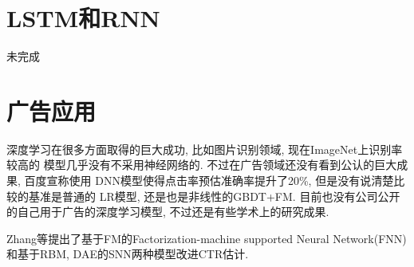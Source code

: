 \documentclass{ctexart}
\begin{document}
\section{LSTM和RNN}
未完成

\section{广告应用}
深度学习在很多方面取得的巨大成功, 比如图片识别领域, 现在ImageNet上识别率较高的
模型几乎没有不采用神经网络的. 不过在广告领域还没有看到公认的巨大成果, 百度宣称使用
DNN模型使得点击率预估准确率提升了20\%, 但是没有说清楚比较的基准是普通的
LR模型, 还是也是非线性的GBDT+FM.
目前也没有公司公开的自己用于广告的深度学习模型, 不过还是有些学术上的研究成果.

Zhang等\cite{zhang2016deep}提出了基于FM的Factorization-machine supported Neural
Network(FNN)和基于RBM, DAE的SNN两种模型改进CTR估计.

\printbibliography
\end{document}
